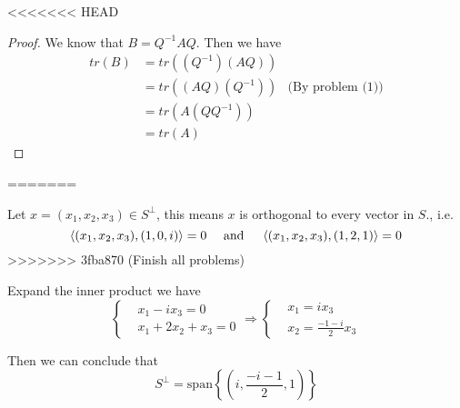 \begin{homeworkProblem}

\solution
<<<<<<< HEAD
\begin{proof}
We know that  $B = Q^{-1}AQ$. Then we have
\[
\begin{aligned}
    tr(B) &= tr((Q^{-1})(AQ)) \\
          &= tr((AQ)(Q^{-1})) & \text{(By problem (1))}\\
          &= tr(A(QQ^{-1})) \\
          &= tr(A)
\end{aligned}
\]
\end{proof}
=======

Let $x = (x_1, x_2, x_3) \in S^{\perp}$, this means $x$ is orthogonal to every vector in $S$., i.e. \[
\innerprod[(x_1, x_2, x_3)]{(1, 0, i)} = 0 \quad \text{ and } \quad \innerprod[(x_1, x_2, x_3)]{(1, 2, 1)} = 0
\]
>>>>>>> 3fba870 (Finish all problems)

Expand the inner product we have \[
\left\{
\begin{aligned}
&x_1 -ix_3 = 0\\
&x_1 + 2x_2 + x_3 = 0
\end{aligned}
\right.
\Longrightarrow
\left\{
\begin{aligned}
&x_1 = ix_3\\
&x_2 = \frac{-1-i}{2}x_3
\end{aligned}
\right.
\]

Then we can conclude that \[
S^{\perp} = \mathrm{span}\left\{\left(i, \frac{-i-1}{2}, 1\right)\right\}
\]
\end{homeworkProblem}
